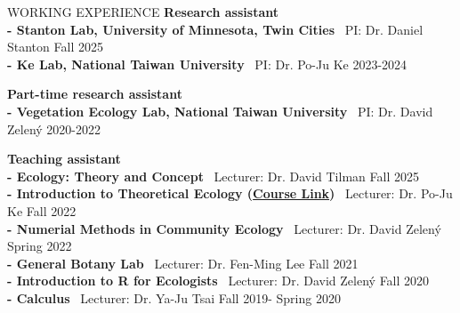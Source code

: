 \documentclass{resume} %
\begin{document}
	\begin{rSection}{WORKING EXPERIENCE}
		\textbf{Research assistant}\\
		\textbf{- Stanton Lab, University of Minnesota, Twin Cities} \ PI: Dr. Daniel Stanton \hfill{Fall 2025}\\
		\textbf{- Ke Lab, National Taiwan University} \ PI: Dr. Po-Ju Ke \hfill{2023-2024}
		

		
		\textbf{Part-time research assistant}\\
		\textbf{- Vegetation Ecology Lab, National Taiwan University} \ PI: Dr. David Zelený \hfill{2020-2022}

		
		\textbf{Teaching assistant}\\
		\textbf{- Ecology: Theory and Concept} \ Lecturer: Dr. David Tilman \hfill{Fall 2025}\\
		\textbf{- Introduction to Theoretical Ecology (\href{https://chinglinhuang.github.io/2022_Fall_TheoEcol/}{Course Link})} \ Lecturer: Dr. Po-Ju Ke \hfill{Fall 2022}\\ 
		\textbf{- Numerial Methods in Community Ecology} \ Lecturer: Dr. David Zelený \hfill{Spring 2022}\\
		\textbf{- General Botany Lab} \ Lecturer: Dr. Fen-Ming Lee \hfill{Fall 2021}\\
		\textbf{- Introduction to R for Ecologists} \ Lecturer: Dr. David Zelený \hfill{Fall 2020}\\
		\textbf{- Calculus} \ Lecturer: Dr. Ya-Ju Tsai \hfill{Fall 2019- Spring 2020}\\
		
		
		
	\end{rSection}
	
\end{document}
